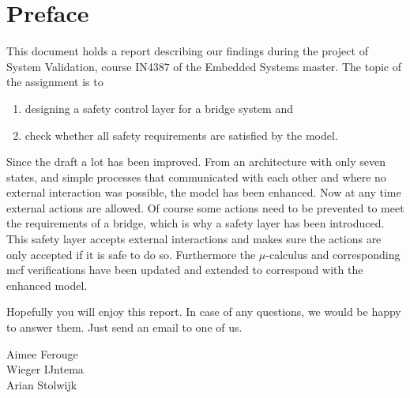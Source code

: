 \newpage
\section*{Preface}

This document holds a report describing our findings during the project of System Validation, course IN4387 of the Embedded Systems master.
The topic of the assignment is to
%
\begin{enumerate}
	\item designing a safety control layer for a bridge system and
	\item check whether all safety requirements are satisfied by the model.
\end{enumerate}
%

Since the draft a lot has been improved. From an architecture with only seven
states, and simple processes that communicated with each other and where no
external interaction was possible, the model has been enhanced. Now at any
time external actions are allowed. Of course some actions need to be prevented
to meet the requirements of a bridge, which is why a safety layer has been
introduced. This safety layer accepts external interactions and makes sure the
actions are only accepted if it is safe to do so. Furthermore the
$\mu$-calculus and corresponding mcf verifications have been updated and
extended to correspond with the enhanced model.

Hopefully you will enjoy this report. In case of any questions, we would be
happy to answer them. Just send an email to one of us.

\vspace{+50pt}
Aimee Ferouge\\
Wieger IJntema\\
Arian Stolwijk


\newpage
